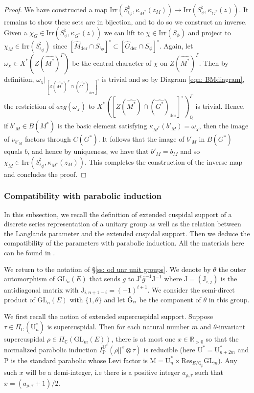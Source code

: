 \documentclass[reqno,11pt]{amsart}
\theoremstyle{remark}
\newcommand{\G}{\mathrm{G}}
\newcommand{\U}{\mathrm{U}}
\newcommand{\J}{\mathrm{J}}
\newcommand{\R}{\mathbb{R}}
\newcommand{\C}{\mathbb{C}}
\newcommand{\Res}{\mathrm{Res}}
\newcommand{\Irr}{\mathrm{Irr}}
\newcommand{\GL}{\mathrm{GL}}
\newcommand{\Q}{\mathbb{Q}}
\newcommand{\der}{\mathrm{der}}
\newcommand{\M}{\mathrm{M}}
\newcommand{\mP}{\mathrm{P}}
\begin{document}
\begin{proof}
We have constructed a map $\Irr(S^{\natural}_{{}^t\phi} , \kappa_{M^*}(z_M)) \to \Irr(S^{\natural}_{\phi}, \kappa_{G^*}(z))$. It remains to show these sets are in bijection, and to do so we construct an inverse. Given a $\chi_G \in \Irr(S^{\natural}_{\phi}, \kappa_{G^*}(z))$ we can lift to $\chi \in \Irr(S_{\phi})$ and project to $ \chi_M \in \Irr(S^{\natural}_{{}^t\phi})$ since $[\widehat{M}_{\der} \cap S_{{}^t\phi}]^{\circ} \subset [\widehat{G}_{\der} \cap S_{\phi}]^{\circ}$. Again, let $\omega_{\chi} \in X^*(Z(\widehat{M^*})^{\Gamma})$ be the central character of $\chi$ on $Z(\widehat{M^*})^{\Gamma}$. Then by definition, $\omega_{\chi}|_{[Z(\widehat{M^*})^{\Gamma} \cap (\widehat{G^*})_{\der}]^{\circ}}$ is trivial and so by Diagram \eqref{eqn: BMdiagram}, the restriction of $avg(\omega_{\chi})$ to $X^*([Z(\widehat{M^*}) \cap (\widehat{G^*})_{\der}]^{\circ})^{\Gamma}_{\Q}$ is trivial. Hence, if $b'_M \in B(M^*)$ is the basic element satisfying $\kappa_{M^*}(b'_M)= \omega_{\chi}$, then the image of $\nu_{b'_M}$ factors through $C(G^*)$. It follows that the image of $b'_M$ in $B(G^*)$ equals $b$, and hence by uniqueness, we have that $b'_M=b_M$ and so $ \chi_M \in \Irr(S^{\natural}_{{}^t\phi}, \kappa_{M^*}(z_M))$. This completes the construction of the inverse map and concludes the proof. 
\end{proof}


\subsubsection{Compatibility with parabolic induction}



In this subsection, we recall the definition of extended cuspidal support of a discrete series representation of a unitary group as well as the relation between the Langlands parameter and the extended cuspidal support. Then we deduce the compatibility of the parameters with parabolic induction. All the materials here can be found in \cite{Moe}.

We return to the notation of \S \ref{ss: od unr unit groups}.  We denote by $\theta$ the outer automorphism of $\GL_n(E)$ that sends $g$ to $\J^t \overline{g}^{-1} \J^{-1}$ where $\J = (\J_{i,j})$ is the antidiagonal matrix with $\J_{i, n+1-i} = (-1)^{i+1}$. We consider the semi-direct product of $\GL_n(E)$ with $\{ 1,\theta \}$ and let $\Tilde{\G}_n$ be the component of $\theta$ in this group. 

We first recall the notion of extended supercuspidal support. Suppose $\tau \in \Pi_{\C}(\U^*_n)$ is supercuspidal. Then for each natural number $m$ and $\theta$-invariant supercuspidal $\rho \in \Pi_{\C}(\GL_m(E))$, there is at most one $x \in \R_{>0}$ so that the normalized parabolic induction $I^{\U^*}_{\mP} (\rho||^x \otimes \tau)$ is reducible (here $\U^* = \U^*_{n + 2m}$ and $\mP$ is the standard parabolic whose Levi factor is $\M = \U^*_{n} \times \Res_{E/\Q_p} \GL_{m}$). Any such $x$ will be a demi-integer, i.e there is a positive integer $a_{\rho, \tau}$ such that $ x = (a_{\rho, \tau}+1)/2 $. 
\end{document}
